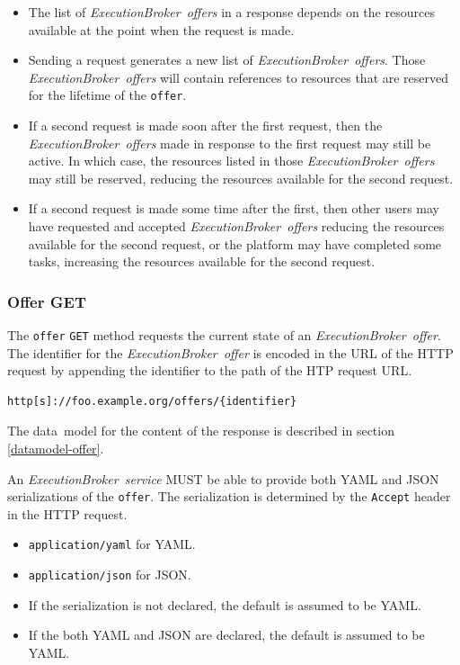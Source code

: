 \documentclass[11pt,a4paper]{ivoa}
\newcommand{\json} {JSON}
\newcommand{\yaml} {YAML}
\newcommand{\datamodel} {data~model}
\newcommand{\execbrokerservice}[1] {\textit{ExecutionBroker~service#1}}
\newcommand{\execoffer}[1] {\textit{ExecutionBroker~offer#1}}
\newcommand{\codeword}[1] {\texttt{#1}}
\begin{document}
\begin{itemize}
    \item The list of \execoffer{s} in a response depends on the resources available at the point when the request is made.
    \item Sending a request generates a new list of \execoffer{s}.
    Those \execoffer{s} will contain references to resources that are reserved for the lifetime of the \codeword{offer}.
    \item If a second request is made soon after the first request,
    then the \execoffer{s} made in response to the first request may still be active.
    In which case, the resources listed in those \execoffer{s} may still be reserved,
    reducing the resources available for the second request.
    \item If a second request is made some time after the first, then
    other users may have requested and accepted \execoffer{s} reducing the resources available for the second request,
    or the platform may have completed some tasks, increasing the resources available for the second request.
\end{itemize}

\subsubsection{Offer GET}
\label{execution-planner-offer-get}

The \codeword{offer} \codeword{GET} method requests the current state of an \execoffer{}.
The identifier for the \execoffer{} is encoded in the URL of the HTTP request by appending the
identifier to the path of the HTP request URL.

\begin{lstlisting}[]
http[s]://foo.example.org/offers/{identifier}
\end{lstlisting}

The \datamodel{} for the content of the response is described in section
\ref{datamodel-offer}.

An \execbrokerservice{} MUST be able to provide both \yaml{} and \json{} serializations
of the \codeword{offer}.
The serialization is determined by the \codeword{Accept} header in the HTTP request.
\begin{itemize}
    \item \codeword{application/yaml} for \yaml{}.
    \item \codeword{application/json} for \json{}.
    \item If the serialization is not declared, the default is assumed to be \yaml{}.
    \item If the both \yaml{} and \json{} are declared, the default is assumed to be \yaml{}.
\end{itemize}
\end{document}
